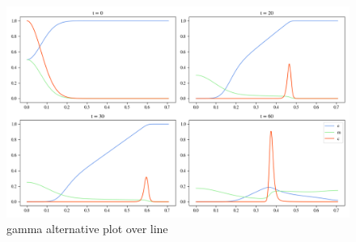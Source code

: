 \begin{figure}[h]
    \centering
    \includegraphics[width=\textwidth]{resources/images/gamma_alt_pol.png}
    \caption{gamma alternative plot over line}
    \label{fig:gamma_alt_pol}
\end{figure}

